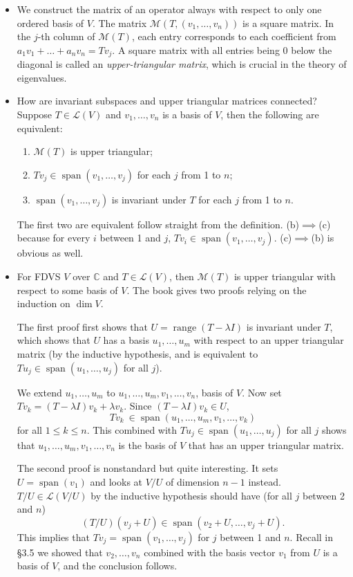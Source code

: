 \documentclass{article}
\newcommand{\C}{\mathbb{C}}
\newcommand{\s}{\operatorname{span}}
\renewcommand{\r}{\operatorname{range}}
\renewcommand{\d}{\dim}
\newcommand{\LV}{\mathcal{L}(V)}
\newcommand{\M}{\mathcal{M}}
\begin{document}
\begin{itemize}
    \item We construct the matrix of an operator always with respect to only one ordered basis of $V$. The matrix $\M(T,(v_1,\dots,v_n))$ is a square matrix. In the $j$-th column of $\M(T)$, each entry corresponds to each coefficient from $a_1v_1+\dots+a_nv_n = Tv_j$. A square matrix with all entries being 0 below the diagonal is called an \textit{upper-triangular matrix}, which is crucial in the theory of eigenvalues.
    \item How are invariant subspaces and upper triangular matrices connected? Suppose $T \in \LV$ and $v_1,\dots,v_n$ is a basis of $V$, then the following are equivalent:
    \begin{enumerate}[label=(\alph*)]
        \item $\M(T)$ is upper triangular;
        \item $Tv_j \in \s(v_1,\dots,v_j)$ for each $j$ from 1 to $n$;
        \item $\s(v_1,\dots,v_j)$ is invariant under $T$ for each $j$ from 1 to $n$.
    \end{enumerate}
    The first two are equivalent follow straight from the definition. (b)$\implies$(c) because for every $i$ between 1 and $j$, $Tv_i \in \s(v_1,\dots,v_j)$. (c)$\implies$(b) is obvious as well.
    \item For FDVS $V$ over $\C$ and $T \in \LV$, then $\M(T)$ is upper triangular with respect to some basis of $V$. The book gives two proofs relying on the induction on $\d V$. 
    
    The first proof first shows that $U = \r(T - \lambda I)$ is invariant under $T$, which shows that $U$ has a basis $u_1,\dots,u_m$ with respect to an upper triangular matrix (by the inductive hypothesis, and is equivalent to $Tu_j \in \s(u_1,\dots,u_j)$ for all $j$).
    
    We extend $u_1,\dots,u_m$ to $u_1,\dots,u_m,v_1,\dots,v_n$, basis of $V$. Now set $Tv_k = (T-\lambda I)v_k+\lambda v_k$. Since $(T-\lambda I)v_k \in U$, $$Tv_k\ \in \s(u_1,\dots,u_m,v_1,\dots,v_k)$$ for all $1 \leq k \leq n$. This combined with $Tu_j \in \s(u_1,\dots,u_j)$ for all $j$ shows that $u_1,\dots,u_m,v_1,\dots,v_n$ is the basis of $V$ that has an upper triangular matrix.
    
    The second proof is nonstandard but quite interesting. It sets $U = \s(v_1)$ and looks at $V/U$ of dimension $n-1$ instead. $T/U \in \mathcal{L}(V/U)$ by the inductive hypothesis should have (for all $j$ between 2 and $n$) $$(T/U)(v_j+U) \in \s(v_2+U,\dots,v_j+U).$$ This implies that $Tv_j = \s(v_1,\dots,v_j)$ for $j$ between 1 and $n$. Recall in \S3.5 we showed that $v_2,\dots,v_n$ combined with the basis vector $v_1$ from $U$ is a basis of $V$, and the conclusion follows.
    

\end{itemize}
\end{document}
